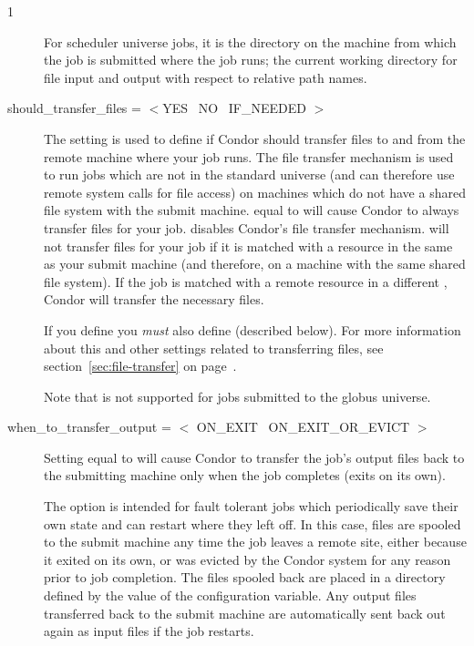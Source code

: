 \begin{ManPage}{\label{man-condor-submit}}{1}
\begin{description}
For scheduler universe jobs,
it is the directory on the machine from which the job is submitted
where the job runs;
the current working directory for file input and output with
respect to relative path names.



\item[should\_transfer\_files = $<$YES \Bar\ NO \Bar\ IF\_NEEDED $>$] 
The  setting is used to define if Condor
should transfer files to and from the remote machine where your job
runs.
The file transfer mechanism is used to run jobs which are not in the
standard universe (and can therefore use remote system calls for file
access) on machines which do not have a shared file system with the
submit machine.
 equal to  will cause Condor to
always transfer files for your job.
 disables Condor's file transfer mechanism.
 will not transfer files for your job if it is matched
with a resource in the same  as your submit
machine (and therefore, on a machine with the same shared file
system).
If the job is matched with a remote resource in a different 
, Condor will transfer the necessary files. 

If you define  you \emph{must} also
define  (described below).
For more information about this and other settings related to
transferring files, see section~\ref{sec:file-transfer} on
page~\pageref{sec:file-transfer}.

Note that  is not supported
for jobs submitted to the globus universe.


\item[when\_to\_transfer\_output = $<$ ON\_EXIT \Bar\ ON\_EXIT\_OR\_EVICT $>$] 

Setting  equal to  will
cause Condor to transfer the job's output files back to the submitting
machine only when the job completes (exits on its own).

The  option is intended for fault tolerant
jobs which periodically save their own state and can restart where
they left off.
In this case, files are spooled to the submit machine any time the
job leaves a remote site, either because it exited on its own, or was
evicted by the Condor system for any reason prior to job completion.
The files spooled back are placed in a directory defined by
the value of the  configuration variable.
Any output files transferred back to the submit machine are
automatically sent back out again as input files if the job restarts.


\end{description}
\end{ManPage}
